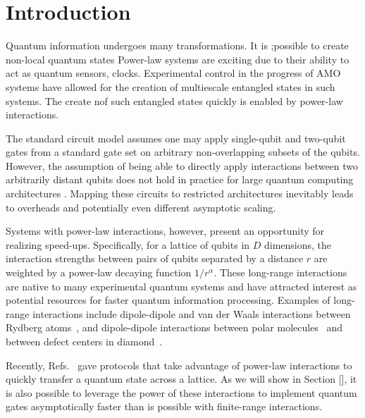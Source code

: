 \chapter{Introduction}

Quantum information undergoes many transformations. It is ;possible to create non-local quantum states
Power-law systems are exciting due to their ability to act as quantum sensors, clocks. Experimental control in the progress of AMO systems have allowed for the creation of multiescale entangled states in such systems. The create nof such entangled states quickly is enabled by power-law interactions.


The standard circuit model assumes one may apply single-qubit and two-qubit gates from a standard gate set on arbitrary non-overlapping subsets of the qubits.
However, the assumption of being able to directly apply interactions between two arbitrarily distant qubits does not hold in practice for large quantum computing architectures \cite{Monroe2014,Linke2017,Bapat2018,Childs2019c,Schoute2022}.
Mapping these circuits to restricted architectures inevitably leads to overheads and potentially even different asymptotic scaling.

Systems with power-law interactions, however, present an opportunity for realizing speed-ups.
Specifically, for a lattice of qubits in $D$ dimensions, the interaction strengths between pairs of qubits separated by a distance $r$ are weighted by a power-law decaying function $1/r^\alpha$. These long-range interactions are native to many experimental quantum systems and have attracted interest as potential resources for faster quantum information processing. Examples of long-range interactions include dipole-dipole and van der Waals interactions between Rydberg atoms~\cite{Saffman2010,Weimer2012}, and dipole-dipole interactions between polar molecules~\cite{Yan2013} and between defect centers in diamond~\cite{Yao2012,Weimer2012}.

Recently, Refs.~\cite{Eldredge2017,Guo2020,Tran2020,kuwaharaStrictlyLinearLight2020} gave protocols that take advantage of power-law interactions to quickly transfer a quantum state across a lattice.
As we will show in Section [], it is also possible to leverage the power of these interactions to implement quantum gates asymptotically faster than is possible with finite-range interactions.

